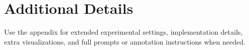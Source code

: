 \section{Additional Details}

Use the appendix for extended experimental settings, implementation details, extra visualizations, and full prompts or annotation instructions when needed.
